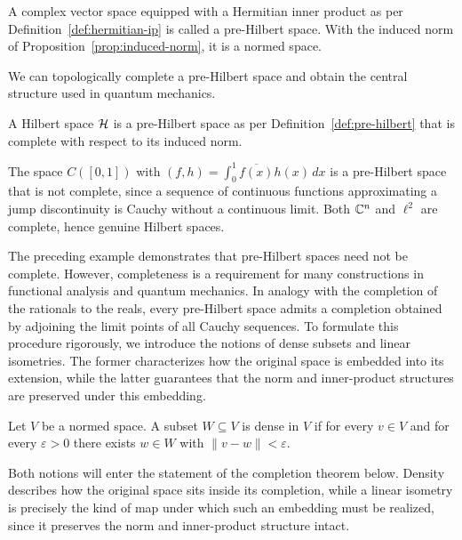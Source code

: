 \begin{definition}\label{def:pre-hilbert}
	A complex vector space equipped with a Hermitian inner product as per Definition~\ref{def:hermitian-ip} is called a pre-Hilbert space. With the induced norm of Proposition~\ref{prop:induced-norm}, it is a normed space.
\end{definition}

\noindent We can topologically complete a pre-Hilbert space and obtain the central structure used in quantum mechanics.

\begin{definition}\label{def:hilbert}
	A Hilbert space $\H$ is a pre-Hilbert space as per Definition~\ref{def:pre-hilbert} that is complete with respect to its induced norm.
\end{definition}

\begin{example}\label{ex:c01-incomplete}
	The space $C([0,1])$ with $( f,h)=\int_0^1\overline{f(x)}h(x)\,dx$ is a pre-Hilbert space that is not complete, since a sequence of continuous functions approximating a jump discontinuity is Cauchy without a continuous limit. Both $\mathbb{C}^n$ and $\ell^2$ are complete, hence genuine Hilbert spaces.
\end{example}

\noindent The preceding example demonstrates that pre-Hilbert spaces need not be complete. However, completeness is a requirement for many constructions in functional analysis and quantum mechanics. In analogy with the completion of the rationals to the reals, every pre-Hilbert space admits a completion obtained by adjoining the limit points of all Cauchy sequences. To formulate this procedure rigorously, we introduce the notions of dense subsets and linear isometries. The former characterizes how the original space is embedded into its extension, while the latter guarantees that the norm and inner-product structures are preserved under this embedding.

\begin{definition}\label{def:dense}
	Let $V$ be a normed space. A subset $W\subseteq V$ is dense in $V$ if for every $v\in V$ and for every $\varepsilon>0$ there exists $w\in W$ with $\|v-w\|<\varepsilon$.
\end{definition}

Both notions will enter the statement of the completion theorem below. Density describes how the original space sits inside its completion, while a linear isometry is precisely the kind of map under which such an embedding must be realized, since it preserves the norm and inner-product structure intact.

